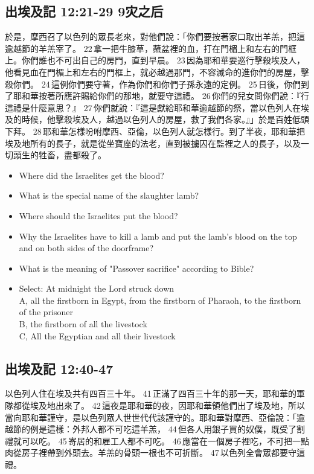 \subsection{出埃及記 12:21-29 9灾之后}
於是，摩西召了以色列的眾長老來，對他們說：「你們要按著家口取出羊羔，把這逾越節的羊羔宰了。 22 拿一把牛膝草，蘸盆裡的血，打在門楣上和左右的門框上。你們誰也不可出自己的房門，直到早晨。 23 因為耶和華要巡行擊殺埃及人，他看見血在門楣上和左右的門框上，就必越過那門，不容滅命的進你們的房屋，擊殺你們。 24 這例你們要守著，作為你們和你們子孫永遠的定例。 25 日後，你們到了耶和華按著所應許賜給你們的那地，就要守這禮。 26 你們的兒女問你們說：『行這禮是什麼意思？』 27 你們就說：『這是獻給耶和華逾越節的祭，當以色列人在埃及的時候，他擊殺埃及人，越過以色列人的房屋，救了我們各家。』」於是百姓低頭下拜。 28 耶和華怎樣吩咐摩西、亞倫，以色列人就怎樣行。到了半夜，耶和華把埃及地所有的長子，就是從坐寶座的法老，直到被擄囚在監裡之人的長子，以及一切頭生的牲畜，盡都殺了。

\begin{itemize}
\item Where did the Israelites get the blood?
\item What is the special name of the slaughter lamb?
\item Where should the Israelites put the blood?
\item Why the Israelites have to kill a lamb and put the lamb's blood on the top and on both sides of the doorframe?
\item What is the meaning of "Passover sacrifice" according to Bible?
\item Select: At midnight the Lord struck down\\
A, all the firstborn in Egypt, from the firstborn of Pharaoh, to the firstborn of the prisoner\\
B, the firstborn of all the livestock\\
C, All the Egyptian and all their livestock
\end{itemize}


\subsection{出埃及記 12:40-47}
以色列人住在埃及共有四百三十年。 41 正滿了四百三十年的那一天，耶和華的軍隊都從埃及地出來了。 42 這夜是耶和華的夜，因耶和華領他們出了埃及地，所以當向耶和華謹守，是以色列眾人世世代代該謹守的。耶和華對摩西、亞倫說：「逾越節的例是這樣：外邦人都不可吃這羊羔， 44 但各人用銀子買的奴僕，既受了割禮就可以吃。 45 寄居的和雇工人都不可吃。 46 應當在一個房子裡吃，不可把一點肉從房子裡帶到外頭去。羊羔的骨頭一根也不可折斷。 47 以色列全會眾都要守這禮。

